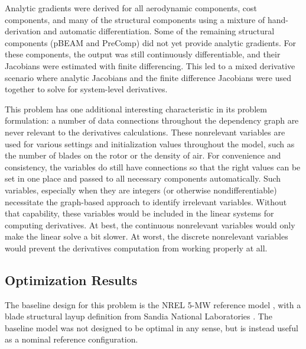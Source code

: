 \documentclass[]{aiaa-tc} %
\begin{document}
    Analytic gradients were derived for all aerodynamic components, cost components, and many of the 
    structural components using a mixture of hand-derivation and automatic differentiation.  Some of 
    the remaining structural components (pBEAM and PreComp) did not yet provide analytic gradients.  
    For these components, the output was still continuously differentiable, and their Jacobians were 
    estimated with finite differencing.  This led to a mixed derivative scenario where analytic 
    Jacobians and the finite difference Jacobians were used together to solve for system-level 
    derivatives.





    This problem has one additional interesting characteristic in its
    problem formulation: a number of data connections throughout the dependency
    graph are never relevant to the derivatives calculations. These nonrelevant
    variables are used for various settings and initialization values throughout the
    model, such as the number of blades on the rotor or the density of air. For convenience
    and consistency, the variables do still have connections so that the right values can
    be set in one place and passed to all necessary components automatically.
    Such variables, especially when they are integers (or otherwise nondifferentiable)
    necessitate the graph-based approach to identify irrelevant variables. Without that capability, these
    variables would be included in the linear systems for computing derivatives. At best,
    the continuous nonrelevant variables would only make the linear solve a bit slower.
    At worst, the discrete nonrelevant variables would prevent the derivatives computation from working properly at all.


    \subsection{Optimization Results}

    The baseline design for this problem is the NREL 5-MW reference model \cite{Jonkman2009}, with a blade structural layup definition from Sandia National Laboratories \cite{Resor2013}.  The baseline model was not designed to be optimal in any sense, but is instead useful as a nominal reference configuration.
\end{document}
